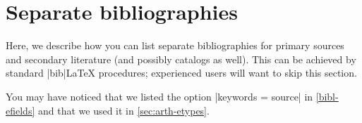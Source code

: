 \documentclass[a4paper,
10pt,
ngerman,
english
]{ltxdoc}
\begin{document}
\section{Separate bibliographies}\label{sec:sepbib}
Here, we describe how you can list separate bibliographies for primary sources and secondary literature (and possibly catalogs as well). This can be achieved by standard |bib|\LaTeX{} procedures; experienced users will want to skip this section.

You may have noticed that we listed the option |keywords = {source}| in \cref{bibl-efields} and that we used it in \cref{sec:arth-etypes}.

%
%
%
%
%
%
\end{document}
